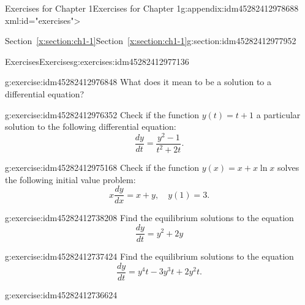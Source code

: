 \documentclass[oneside,10pt,]{book}
\numberwithin{equation}{section}
\numberwithin{equation}{section}
\begin{document}
\begin{appendixptx}{Exercises for Chapter 1}{}{Exercises for Chapter 1}{}{}{g:appendix:idm45282412978688}
xml:id="exercises"\textgreater{} %
%
\typeout{************************************************}
\typeout{************************************************}
%
\begin{sectionptx}{Section~\ref*{x:section:ch1-1}}{}{Section~\ref*{x:section:ch1-1}}{}{}{g:section:idm45282412977952}
%
%
\typeout{************************************************}
\typeout{************************************************}
%
\begin{exercises-subsection-numberless}{Exercises}{}{Exercises}{}{}{g:exercises:idm45282412977136}
\begin{divisionexercise}{1}{}{}{g:exercise:idm45282412976848}%
What does it mean to be a solution to a differential equation?\end{divisionexercise}%
\begin{divisionexercise}{2}{}{}{g:exercise:idm45282412976352}%
Check if the function \(y(t)=t+1\) a particular solution to the following differential equation:%
\begin{equation*}
\frac{dy}{dt}=\frac{y^{2}-1}{t^{2}+2t}.
\end{equation*}
\end{divisionexercise}%
\begin{divisionexercise}{3}{}{}{g:exercise:idm45282412975168}%
Check if the function \(y(x)=x+x\ln x\) solves the following initial value problem:%
\begin{equation*}
x\frac{dy}{dx}=x+y,\,\,\,\,\,\,y(1)=3.
\end{equation*}
\end{divisionexercise}%
\begin{divisionexercise}{4}{}{}{g:exercise:idm45282412738208}%
Find the equilibrium solutions to the equation%
\begin{equation*}
\frac{dy}{dt}=y^{2}+2y
\end{equation*}
\end{divisionexercise}%
\begin{divisionexercise}{5}{}{}{g:exercise:idm45282412737424}%
Find the equilibrium solutions to the equation%
\begin{equation*}
\frac{dy}{dt}=y^{4}t-3y^{3}t+2y^{2}t.
\end{equation*}
\end{divisionexercise}%
\begin{divisionexercise}{6}{}{}{g:exercise:idm45282412736624}%

\end{divisionexercise}
\end{exercises-subsection-numberless}
\end{sectionptx}
\end{appendixptx}
\end{document}
